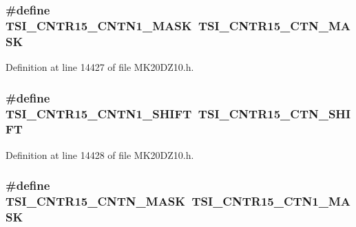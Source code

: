 \subsubsection[{\texorpdfstring{T\+S\+I\+\_\+\+C\+N\+T\+R15\+\_\+\+C\+N\+T\+N1\+\_\+\+M\+A\+SK}{TSI_CNTR15_CNTN1_MASK}}]{\setlength{\rightskip}{0pt plus 5cm}\#define T\+S\+I\+\_\+\+C\+N\+T\+R15\+\_\+\+C\+N\+T\+N1\+\_\+\+M\+A\+SK~{\bf T\+S\+I\+\_\+\+C\+N\+T\+R15\+\_\+\+C\+T\+N\+\_\+\+M\+A\+SK}}\hypertarget{group___backward___compatibility___symbols_ga3b83c839fd79b35f54a2dae8b61ca860}{}\label{group___backward___compatibility___symbols_ga3b83c839fd79b35f54a2dae8b61ca860}


Definition at line 14427 of file M\+K20\+D\+Z10.\+h.

\subsubsection[{\texorpdfstring{T\+S\+I\+\_\+\+C\+N\+T\+R15\+\_\+\+C\+N\+T\+N1\+\_\+\+S\+H\+I\+FT}{TSI_CNTR15_CNTN1_SHIFT}}]{\setlength{\rightskip}{0pt plus 5cm}\#define T\+S\+I\+\_\+\+C\+N\+T\+R15\+\_\+\+C\+N\+T\+N1\+\_\+\+S\+H\+I\+FT~{\bf T\+S\+I\+\_\+\+C\+N\+T\+R15\+\_\+\+C\+T\+N\+\_\+\+S\+H\+I\+FT}}\hypertarget{group___backward___compatibility___symbols_ga7711904a938d2cee0fdc00fc4d486726}{}\label{group___backward___compatibility___symbols_ga7711904a938d2cee0fdc00fc4d486726}


Definition at line 14428 of file M\+K20\+D\+Z10.\+h.

\subsubsection[{\texorpdfstring{T\+S\+I\+\_\+\+C\+N\+T\+R15\+\_\+\+C\+N\+T\+N\+\_\+\+M\+A\+SK}{TSI_CNTR15_CNTN_MASK}}]{\setlength{\rightskip}{0pt plus 5cm}\#define T\+S\+I\+\_\+\+C\+N\+T\+R15\+\_\+\+C\+N\+T\+N\+\_\+\+M\+A\+SK~{\bf T\+S\+I\+\_\+\+C\+N\+T\+R15\+\_\+\+C\+T\+N1\+\_\+\+M\+A\+SK}}\hypertarget{group___backward___compatibility___symbols_ga8925dd22c3b058610ee9ab2967a9e23d}{}\label{group___backward___compatibility___symbols_ga8925dd22c3b058610ee9ab2967a9e23d}


